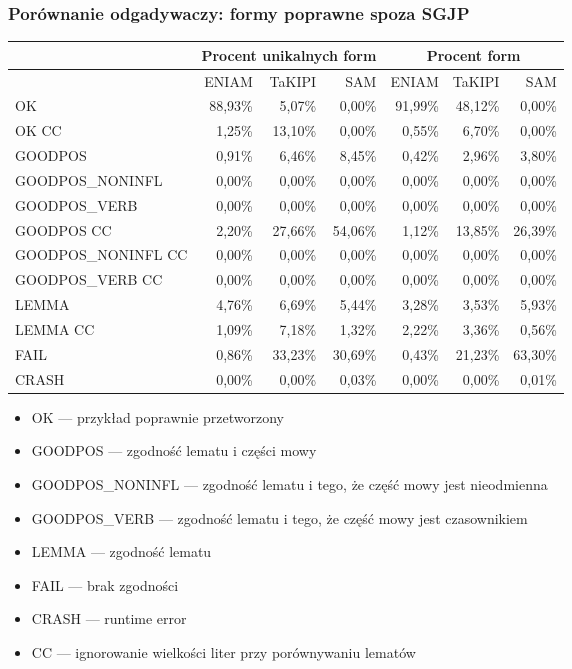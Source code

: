 \documentclass{beamer}
\begin{document}
\begin{frame}
\frametitle{Porównanie odgadywaczy: formy poprawne spoza SGJP}
\begin{center}\begin{scriptsize}
\begin{tabular}{l|rrr|rrr}
& \multicolumn{3}{c|}{Procent unikalnych form} &
\multicolumn{3}{c}{Procent form} \\
\hline
& ENIAM & TaKIPI & SAM & ENIAM & TaKIPI & SAM \\
\hline
OK & 88,93\% & 5,07\% & 0,00\% & 91,99\% & 48,12\% & 0,00\% \\
OK CC & 1,25\% & 13,10\% & 0,00\% & 0,55\% & 6,70\% & 0,00\% \\
GOODPOS & 0,91\% & 6,46\% & 8,45\% & 0,42\% & 2,96\% & 3,80\% \\
GOODPOS\_NONINFL & 0,00\% & 0,00\% & 0,00\% & 0,00\% & 0,00\% & 0,00\% \\
GOODPOS\_VERB & 0,00\% & 0,00\% & 0,00\% & 0,00\% & 0,00\% & 0,00\% \\
GOODPOS CC & 2,20\% & 27,66\% & 54,06\% & 1,12\% & 13,85\% & 26,39\% \\
GOODPOS\_NONINFL CC & 0,00\% & 0,00\% & 0,00\% & 0,00\% & 0,00\% & 0,00\% \\
GOODPOS\_VERB CC & 0,00\% & 0,00\% & 0,00\% & 0,00\% & 0,00\% & 0,00\% \\
LEMMA & 4,76\% & 6,69\% & 5,44\% & 3,28\% & 3,53\% & 5,93\% \\
LEMMA CC & 1,09\% & 7,18\% & 1,32\% & 2,22\% & 3,36\% & 0,56\% \\
FAIL & 0,86\% & 33,23\% & 30,69\% & 0,43\% & 21,23\% & 63,30\% \\
CRASH & 0,00\% & 0,00\% & 0,03\% & 0,00\% & 0,00\% & 0,01\% \\
\end{tabular}
\end{scriptsize}\end{center}
\begin{scriptsize}\begin{itemize}
\item OK --- przykład poprawnie przetworzony
\item GOODPOS --- zgodność lematu i części mowy
\item GOODPOS\_NONINFL --- zgodność lematu i tego, że część mowy jest nieodmienna
\item GOODPOS\_VERB --- zgodność lematu i tego, że część mowy jest czasownikiem
\item LEMMA --- zgodność lematu
\item FAIL --- brak zgodności
\item CRASH --- runtime error
\item CC --- ignorowanie wielkości liter przy porównywaniu lematów
\end{itemize}\end{scriptsize}
\end{frame}
\end{document}

